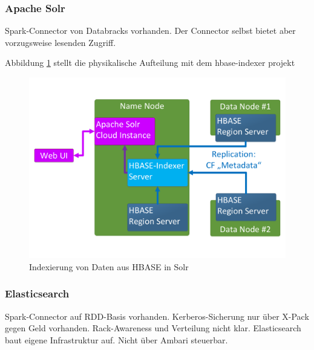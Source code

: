 \subsubsection{Apache Solr}
Spark-Connector von Databracks vorhanden. Der Connector selbst bietet aber vorzugsweise lesenden Zugriff.

\noindent
Abbildung \ref{fig:hbase_solr_indexing} stellt die physikalische Aufteilung mit dem hbase-indexer projekt

\begin{figure}[ht]
  \centering
  \includegraphics[width=\textwidth]{./resource/hbase_solr_indexierung.pdf}
  \caption{Indexierung von Daten aus HBASE in Solr}
  \label{fig:hbase_solr_indexing}
\end{figure}

\subsubsection{Elasticsearch}
Spark-Connector auf RDD-Basis vorhanden. Kerberos-Sicherung nur über X-Pack gegen Geld vorhanden. Rack-Awareness und Verteilung nicht klar. Elasticsearch baut eigene Infrastruktur auf. Nicht über Ambari steuerbar.